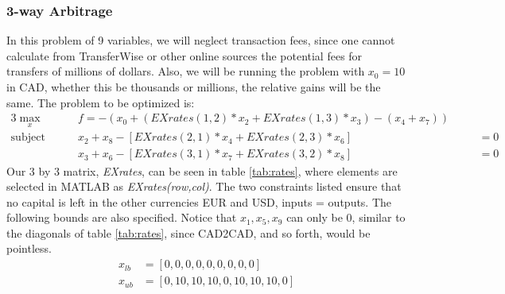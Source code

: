 \documentclass[12pt]{article}
\begin{document}
\subsubsection{3-way Arbitrage}
In this problem of 9 variables, we will neglect transaction fees, since one cannot calculate from TransferWise or other online sources the potential fees for transfers of millions of dollars. Also, we will be running the problem with $x_{0}=10$ in CAD, whether this be thousands or millions, the relative gains will be the same. The problem to be optimized is:
\begin{alignat}{3}
\max_x              &\quad&  f = -(x_{0} + (EXrates(1,2)*x_{2} + EXrates(1,3)*x_{3}) - (x_{4} + x_{7}))  &          & \\
\text{subject to: } &  &  x_{2} + x_{8} - [EXrates(2,1)*x_{4} + EXrates(2,3)*x_{6}] && \quad = 0 & \\
 &  &  x_{3} + x_{6} - [EXrates(3,1)*x_{7} + EXrates(3,2)*x_{8}] && \quad = 0 & 
\end{alignat}
Our 3 by 3 matrix, \textit{EXrates}, can be seen in table \ref{tab:rates}, where elements are selected in MATLAB as \textit{EXrates(row,col)}. The two constraints listed ensure that no capital is left in the other currencies EUR and USD, inputs = outputs. The following bounds are also specified. Notice that $x_{1}, x_{5}, x_{9}$ can only be 0, similar to the diagonals of table \ref{tab:rates}, since CAD2CAD, and so forth, would be pointless.
\begin{equation}
\begin{split}
x_{lb} & = [0,0,0,0,0,0,0,0,0]\\
x_{ub} & = [0,10,10,10,0,10,10,10,0]
\end{split}
\end{equation}
\end{document}
